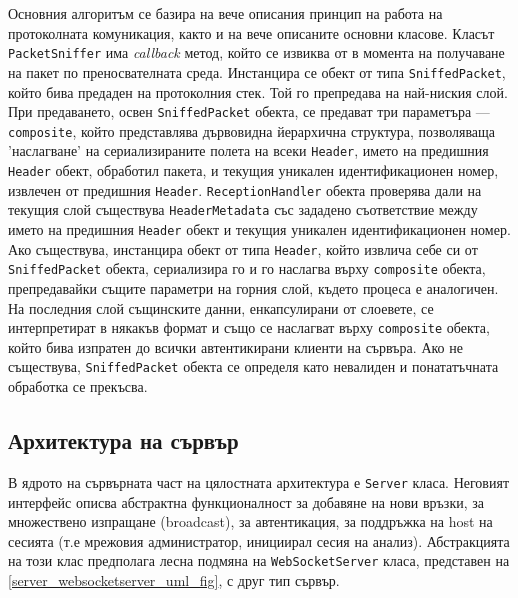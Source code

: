 \documentclass[12pt,a4paper,oneside]{book}
\begin{document}
Основния алгоритъм се базира на вече описания принцип на работа на протоколната
комуникация, както и на вече описаните основни класове. Класът
\texttt{PacketSniffer} има \textit{callback} метод, който се извиква от
в момента на получаване на пакет по преносвателната среда. Инстанцира се обект
от типа \texttt{SniffedPacket}, който бива предаден на протоколния стек. Той го
препредава на най-ниския слой. При предаването, освен \texttt{SniffedPacket} обекта, се
предават три параметъра ---
\texttt{composite}, който представлява дървовидна йерархична структура,
позволяваща 'наслагване' на сериализираните полета на
всеки \texttt{Header}, името на предишния \texttt{Header} обект, обработил пакета, и текущия уникален
идентификационен номер, извлечен от предишния \texttt{Header}. \texttt{ReceptionHandler} обекта
проверява дали на текущия слой съществува \texttt{HeaderMetadata} със зададено
съответствие между името на предишния \texttt{Header} обект и текущия уникален
идентификационен номер. Ако
съществува, инстанцира обект от типа \texttt{Header}, който извлича себе си от
\texttt{SniffedPacket} обекта, сериализира го и го наслагва върху
\texttt{composite}
обекта, препредавайки същите параметри на горния слой, където процеса е
аналогичен. На последния слой същинските данни, енкапсулирани от слоевете, се
интерпретират в някакъв формат и също се наслагват върху \texttt{composite} обекта,
който бива изпратен до всички автентикирани клиенти на сървъра. Ако не
съществува,
\texttt{SniffedPacket} обекта се определя като невалиден и понататъчната
обработка се прекъсва.

\subsection{Архитектура на сървър}

В ядрото на сървърната част на цялостната архитектура е \texttt{Server} класа.
Неговият интерфейс описва абстрактна функционалност за добавяне на нови връзки,
за множествено изпращане (broadcast), за автентикация, за поддръжка на host на
сесията (т.е мрежовия администратор, инициирал сесия на анализ). Абстракцията на
този клас предполага лесна подмяна на \texttt{WebSocketServer} класа, представен
на \autoref{server_websocketserver_uml_fig}, с друг тип
сървър.
\end{document}
